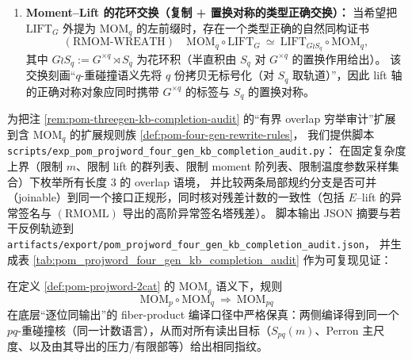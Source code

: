 \begin{definition}
\begin{enumerate}
\[  \]
  其中右端 \(\mathrm{MOM}_{\chi_1,\dots,\chi_q}\) 表示“在 \(q\) 份拷贝上分别施加 \(\mathrm{TWIST}(\chi_i)\) 后的多扭曲 moment-kernel”（其有限 \(m\) 读出满足命题 \ref{prop:pom-mom-lift-fourier-distribution} 的严格恒等式）。
  该分配律的可核对输出由高阶异常签名塔 \(\mathsf{Anom}^{(q)}_G(K;\theta)\) 组织（定义 \ref{def:pom-anom-signature-tower}）。
  \item \textbf{Moment--Lift 的花环交换（复制 + 置换对称的类型正确交换）：}
  当希望把 \(\mathrm{LIFT}_G\) 外提为 \(\mathrm{MOM}_q\) 的左前缀时，存在一个类型正确的自然同构证书
  \[
  (\mathrm{RMOM\text{-}WREATH})\quad
  \mathrm{MOM}_q\circ \mathrm{LIFT}_G
  \ \simeq\
  \mathrm{LIFT}_{G\wr S_q}\circ \mathrm{MOM}_q,
  \]
  其中
  \(G\wr S_q:=G^{\times q}\rtimes S_q\)
  为花环积（半直积由 \(S_q\) 对 \(G^{\times q}\) 的置换作用给出）。
  该交换刻画“\(q\)-重碰撞语义先将 \(q\) 份拷贝无标号化（对 \(S_q\) 取轨道）”，因此 lift 轴的正确对称对象应同时携带 \(G^{\times q}\) 的标签与 \(S_q\) 的置换对称。
\end{enumerate}
\end{definition}

\begin{remark}\label{rem:pom-fourgen-kb-completion-audit}
为把注 \ref{rem:pom-threegen-kb-completion-audit} 的“有界 overlap 穷举审计”扩展到含 \(\mathrm{MOM}_q\) 的扩展规则族 \ref{def:pom-four-gen-rewrite-rules}，
我们提供脚本
\texttt{scripts/exp\_pom\_projword\_four\_gen\_kb\_completion\_audit.py}：
在固定复杂度上界（限制 \(m\)、限制 lift 的群列表、限制 moment 阶列表、限制温度参数采样集合）下枚举所有长度 \(3\) 的 overlap 语境，
并比较两条局部规约分支是否可并（joinable）到同一个接口正规形，同时核对残差计数的一致性（包括 \(E\)--lift 的异常签名与 \((\mathrm{RMOML})\) 导出的高阶异常签名塔残差）。
脚本输出 JSON 摘要与若干反例轨迹到
\texttt{artifacts/export/pom\_projword\_four\_gen\_kb\_completion\_audit.json}，
并生成表 \ref{tab:pom_projword_four_gen_kb_completion_audit} 作为可复现见证：

\end{remark}

\begin{proposition}\label{prop:pom-rmom-sound}
\leanverified{paper\_pom\_rmom\_sound}
在定义 \ref{def:pom-projword-2cat} 的 \(\mathrm{MOM}_q\) 语义下，规则
\[
\mathrm{MOM}_p\circ \mathrm{MOM}_q\ \Rightarrow\ \mathrm{MOM}_{pq}
\]
在底层“逐位同输出”的 fiber-product 编译口径中严格保真：两侧编译得到同一个 \(pq\)-重碰撞核（同一计数语言），从而对所有读出目标（\(S_{pq}(m)\)、Perron 主尺度、以及由其导出的压力/有限部等）给出相同指纹。
\end{proposition}

